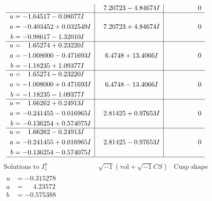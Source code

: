 \documentclass[1p]{elsarticle_modified}
\theoremstyle{definition}
\newcommand{\I}{\sqrt{-1}}
\begin{document}
$$\begin{array}{c|c|c}
 & \phantom{-}7.20723 - 4.84674 I & \phantom{-0.000000 } 0 \\ \hline\begin{aligned}
u &= -1.64517 - 0.08077 I \\
a &= -0.403452 + 0.032549 I \\
b &= -0.98617 - 1.32010 I\end{aligned}
 & \phantom{-}7.20723 + 4.84674 I & \phantom{-0.000000 } 0 \\ \hline\begin{aligned}
u &= \phantom{-}1.65274 + 0.23220 I \\
a &= -1.008000 - 0.471693 I \\
b &= -1.18235 + 1.09377 I\end{aligned}
 & \phantom{-}6.4748 + 13.4066 I & \phantom{-0.000000 } 0 \\ \hline\begin{aligned}
u &= \phantom{-}1.65274 - 0.23220 I \\
a &= -1.008000 + 0.471693 I \\
b &= -1.18235 - 1.09377 I\end{aligned}
 & \phantom{-}6.4748 - 13.4066 I & \phantom{-0.000000 } 0 \\ \hline\begin{aligned}
u &= \phantom{-}1.66262 + 0.24913 I \\
a &= -0.241455 - 0.016965 I \\
b &= -0.136254 + 0.574075 I\end{aligned}
 & \phantom{-}2.81425 + 0.97653 I & \phantom{-0.000000 } 0 \\ \hline\begin{aligned}
u &= \phantom{-}1.66262 - 0.24913 I \\
a &= -0.241455 + 0.016965 I \\
b &= -0.136254 - 0.574075 I\end{aligned}
 & \phantom{-}2.81425 - 0.97653 I & \phantom{-0.000000 } 0\\
 \hline 
 \end{array}$$\newpage$$\begin{array}{c|c|c}  
\text{Solutions to }I^u_{1}& \I (\text{vol} + \sqrt{-1}CS) & \text{Cusp shape}\\
 \hline 
\begin{aligned}
u &= -0.315278\phantom{ +0.000000I} \\
a &= \phantom{-}4.23572\phantom{ +0.000000I} \\
b &= -0.575388\phantom{ +0.000000I}\end{aligned}

\end{array}$$
\end{document}
